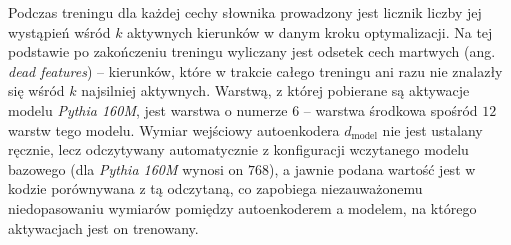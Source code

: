 Podczas treningu dla każdej cechy słownika prowadzony jest licznik liczby jej wystąpień wśród $k$ aktywnych kierunków w danym kroku optymalizacji. Na tej podstawie po zakończeniu treningu wyliczany jest odsetek cech martwych (ang. \textit{dead features}) -- kierunków, które w trakcie całego treningu ani razu nie znalazły się wśród $k$ najsilniej aktywnych. \newline
Warstwą, z której pobierane są aktywacje modelu \textit{Pythia 160M}, jest warstwa o numerze $6$ -- warstwa środkowa spośród $12$ warstw tego modelu. Wymiar wejściowy autoenkodera $d_{\mathrm{model}}$ nie jest ustalany ręcznie, lecz odczytywany automatycznie z konfiguracji wczytanego modelu bazowego (dla \textit{Pythia 160M} wynosi on $768$), a jawnie podana wartość jest w kodzie porównywana z tą odczytaną, co zapobiega niezauważonemu niedopasowaniu wymiarów pomiędzy autoenkoderem a modelem, na którego aktywacjach jest on trenowany. \newline

